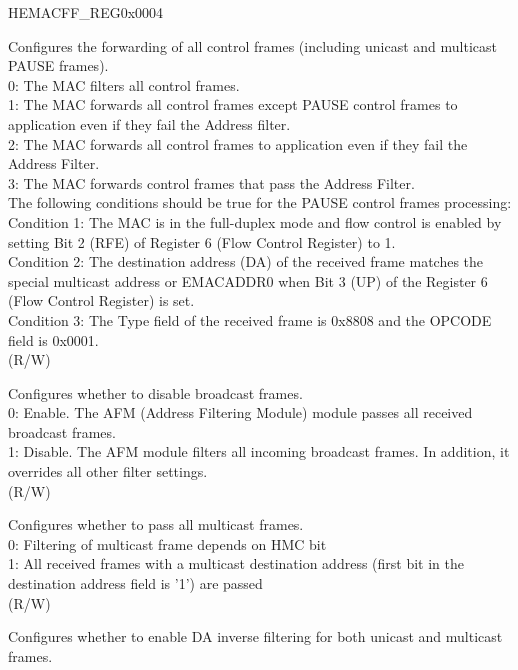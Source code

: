 \addtocounter{Regfloat}{-1}
\begin{register}{H}{EMACFF\_REG}{0x0004}
\begin{regdesc}\begin{reglist}
\item[Continued from the previous page...]

\item [PCF] Configures the forwarding of all control frames (including unicast and multicast PAUSE frames).\\
0: The MAC filters all control frames.\\
1: The MAC forwards all control frames except PAUSE control frames to application even if they fail the Address filter.\\
2: The MAC forwards all control frames to application even if they fail the Address Filter.\\
3: The MAC forwards control frames that pass the Address Filter.\\
The following conditions should be true for the PAUSE control frames processing:\\
Condition 1: The MAC is in the full-duplex mode and flow control is enabled by setting Bit 2 (RFE) of Register 6 (Flow Control Register) to 1.\\
Condition 2: The destination address (DA) of the received frame matches the special multicast address or EMACADDR0 when Bit 3 (UP) of the Register 6 (Flow Control Register) is set.\\
Condition 3: The Type field of the received frame is 0x8808 and the OPCODE field is 0x0001.\\
(R/W)
\item [DBF] Configures whether to disable broadcast frames.\\
0: Enable. The AFM (Address Filtering Module) module passes all received broadcast frames.\\
1: Disable. The AFM module filters all incoming broadcast frames. In addition, it overrides all other filter settings.\\ (R/W)
\item [PAM] Configures whether to pass all multicast frames.\\
0: Filtering of multicast frame depends on HMC bit\\
1: All received frames with a multicast destination address (first bit in the destination address field is '1') are passed\\
(R/W)
\item [DAIF] Configures whether to enable DA inverse filtering for both unicast and multicast frames.\\

\end{reglist}
\end{regdesc}
\end{register}
